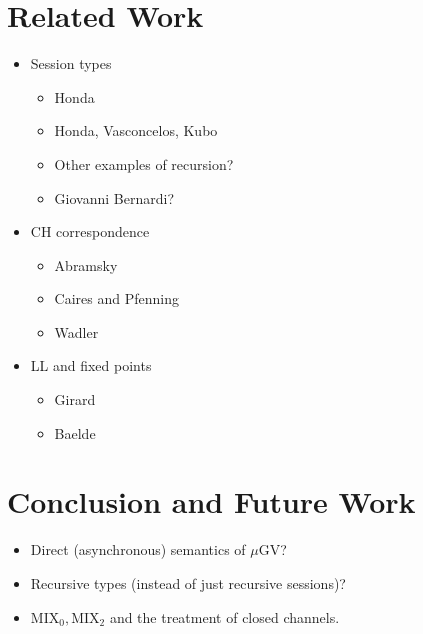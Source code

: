 \documentclass[orivec,envcountsame]{llncs}
\newcommand{\mugv}{$\mu\mathrm{GV}$\xspace}
\begin{document}
\section{Related Work}\label{sec:related}

\begin{itemize}
\item Session types
  \begin{itemize}
  \item Honda
  \item Honda, Vasconcelos, Kubo
  \item Other examples of recursion?
  \item Giovanni Bernardi?
  \end{itemize}
\item CH correspondence
  \begin{itemize}
  \item Abramsky~\citep{Abramsky92,BellinScott94}
  \item Caires and Pfenning~\citep{CairesPfenning10}
  \item Wadler~\citep{Wadler12}
  \end{itemize}
\item LL and fixed points
  \begin{itemize}
  \item Girard~\citep{Girard87}
  \item Baelde~\citep{Baelde12}
  \end{itemize}
\end{itemize}

\section{Conclusion and Future Work}\label{sec:future}

\begin{itemize}
\item Direct (asynchronous) semantics of \mugv{}?
\item Recursive types (instead of just recursive sessions)?
\item $\mathrm{MIX}_0,\mathrm{MIX}_2$ and the treatment of closed channels.
\end{itemize}

\label{sect:bib}


\end{document}
